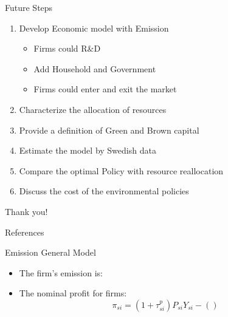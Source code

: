 \documentclass[aspectratio=169]{beamer}
\begin{document}
\begin{frame}[noframenumbering]{Future Steps}
	\begin{enumerate}
		\item\textcolor<1->{fg!30}{ Develop Economic model with Emission }
		\begin{itemize}
			\item<1-| alert@1> Firms could R\&D
			\item<1-| alert@1> Add Household and Government
			\item<1-| alert@1> Firms could enter and exit the market
		\end{itemize} 
		\item\textcolor<1->{fg!30}{Characterize the allocation of resources }
		\item<1-| alert@1> {Provide a definition of Green and Brown capital}
		\item<1-| alert@1> Estimate the model by Swedish data 
		\item<1-| alert@1> Compare the optimal Policy with resource reallocation 
		\item<1-| alert@1> Discuss the cost of the environmental policies 
	\end{enumerate}
\end{frame}


\begin{frame}[noframenumbering]
	\begin{center}
		\Huge
		Thank you!
	\end{center}
\end{frame}

\appendix
\footnotesize
	\begin{frame}[allowframebreaks]{References}
			

		
	\end{frame}
	
	\normalsize

	\begin{frame}{Emission General Model}\label{Emission_General_Model}
		\begin{itemize}
			\item The firm's emission is:
			
			\item The nominal profit for firms:
			\begin{equation}
				\pi_{si} = {(1+\tau_{si}^p) P_{si} Y_{si} - \left(\right)}
			\end{equation}
			\end{itemize}
			\hfill
			\hyperlink{Production_Functions}{}
	\end{frame}
\end{document}
